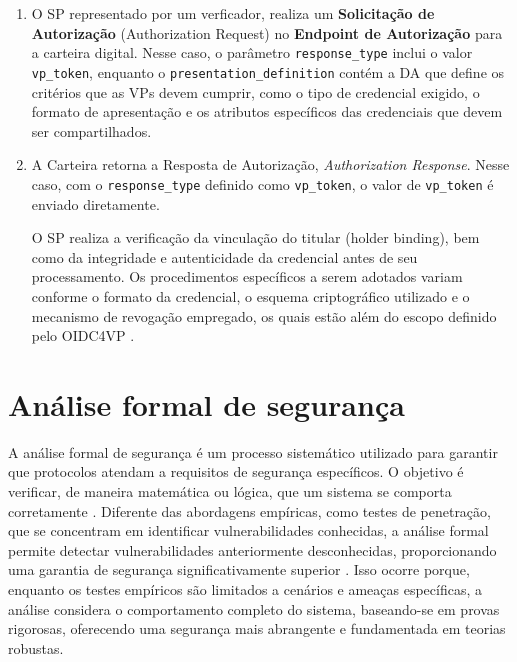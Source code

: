 \begin{enumerate}

    \item O \acs{SP} representado por um verficador, realiza um \textbf{Solicitação de Autorização} (Authorization Request) no \textbf{Endpoint de Autorização} para a carteira digital. 
    Nesse caso, o parâmetro \texttt{response\_type} inclui o valor \texttt{vp\_token}, enquanto o \texttt{presentation\_definition} contém a \acs{DA} que define os critérios que as \acs{VP}s devem cumprir, como o tipo de credencial exigido, o formato de apresentação e os atributos específicos das credenciais que devem ser compartilhados.    %
    
    \item A Carteira retorna a Resposta de Autorização, \emph{Authorization Response}. Nesse caso, com o \texttt{response\_type} definido como \texttt{vp\_token}, o valor de \texttt{vp\_token} é enviado diretamente.

    O \acs{SP} realiza a verificação da vinculação do titular (holder binding), bem como da integridade e autenticidade da credencial antes de seu processamento. Os procedimentos específicos a serem adotados variam conforme o formato da credencial, o esquema criptográfico utilizado e o mecanismo de revogação empregado, os quais estão além do escopo definido pelo \acs{OIDC4VP} \cite{OIDC4VCWhitepaper2022}.

\end{enumerate}

\newpage
\section{Análise formal de segurança}

A análise formal de segurança é um processo sistemático utilizado para garantir que protocolos atendam a requisitos de segurança específicos. O objetivo é verificar, de maneira matemática ou lógica, que um sistema se comporta corretamente \cite{Kulik2020}. Diferente das abordagens empíricas, como testes de penetração, que se concentram em identificar vulnerabilidades conhecidas, a análise formal permite detectar vulnerabilidades anteriormente desconhecidas, proporcionando uma garantia de segurança significativamente superior \cite{hauck2023openid}. Isso ocorre porque, enquanto os testes empíricos são limitados a cenários e ameaças específicas, a análise considera o comportamento completo do sistema, baseando-se em provas rigorosas, oferecendo uma segurança mais abrangente e fundamentada em teorias robustas.

